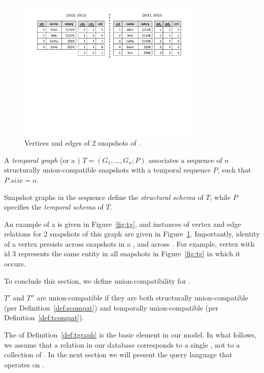 \begin{figure}
\includegraphics[width=3.5in]{figs/2VE.pdf}
\caption{Vertices and edges of 2 snapshots of .}
\label{fig:2ve}
\end{figure}

\begin{definition} [TGraph]
A {\em temporal graph} (or a {\em \tg}) $T = (G_1, \ldots, G_n; P)$
  associates a sequence of $n$ structurally union-compatible snapshots
  with a temporal sequence $P$, such that $P.size = n$.
\label{def:tgraph} 
\end{definition}

Snapshot graphs in the sequence define the {\em structural schema} of
$T$, while $P$ specifies the {\em temporal schema} of $T$.  

An example of a \tg is given in Figure~\ref{fig:tg}, and instances of
vertex and edge relations for 2 snapshots of this graph are given in
Figure~\ref{fig:2ve}.  Importantly, identity of a vertex persists
across snapshots in a \tg, and across \tgs.  For example, vertex with
id $3$ represents the same entity in all snapshots in
Figure~\ref{fig:tg} in which it occurs.


To conclude this section, we define union-compatibility for \tgs.

\begin{definition} 
\label{def:tuc} 
$T'$ and $T''$ are union-compatible \tgs if they are both structurally
union-compatible (per Definition~\ref{def:scompat}) and temporally
union-compatible (per Definition~\ref{def:tcompat}).
\end{definition}

The \tg of Definition~\ref{def:tgraph} is the basic element in our
model.  In what follows, we assume that a relation in our database
corresponds to a single \tg, not to a collection of \tgs.  In the next
section we will present the \ql query language that operates on \tgs.




